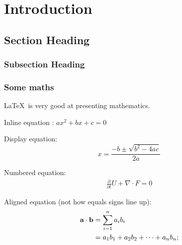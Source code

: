 \chapter{Introduction} %
\label{cha:chapter label} %

\blindtext[1] %

\section{Section Heading} %
\label{sec:section label} %

\blindtext[1]
 
\subsection{Subsection Heading} %
\label{sec:subsection label} %

\blindtext[1]

\subsection{Some maths}


\LaTeX\ is very good at presenting mathematics.

Inline equation :
$ax^2 + bx + c = 0$ %

Display equation:
$$x = \frac{-b \pm \sqrt{b^2 - 4ac}}{2a}$$ %

Numbered equation:
\begin{align}
	\label{eq:equation label} %
	\frac{\partial}{\partial t} U + \nabla \cdot F = 0
\end{align}

Aligned equation (not how equals signs line up):
\begin{align}
	\notag %
	\label{eq:dot product}
	\textbf{a} \cdot \textbf{b} &= \sum_{i=1}^n a_ib_i \\
	&= a_1b_1 + a_2b_2 + \cdots + a_nb_n; %
\end{align}

